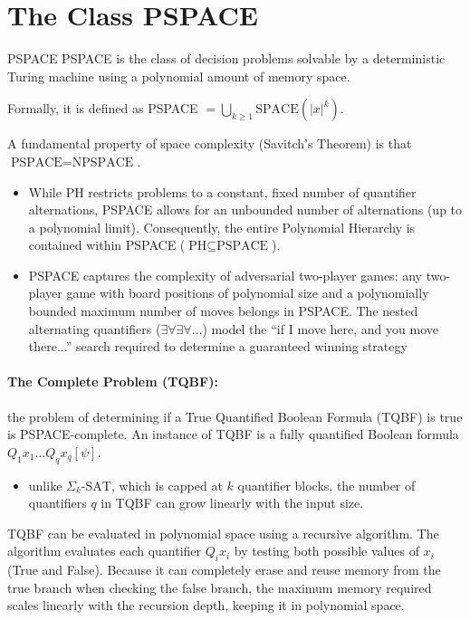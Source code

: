 \documentclass[a4paper, 11pt]{report}
\begin{document}
\section{The Class PSPACE}

\begin{defframe}{PSPACE}{}
PSPACE is the class of decision problems solvable by a deterministic Turing machine using a polynomial amount of memory space.

Formally, it is defined as PSPACE $= \bigcup_{k \ge 1} \text{SPACE}(|x|^k)$. 

A fundamental property of space complexity (Savitch's Theorem) is that $\text{PSPACE} = \text{NPSPACE}$.
\end{defframe}

\begin{itemize}
    \item While $\text{PH}$ restricts problems to a constant, fixed number of quantifier alternations, PSPACE allows for an unbounded number of alternations (up to a polynomial limit). Consequently, the entire Polynomial Hierarchy is contained within PSPACE ($\text{PH} \subseteq \text{PSPACE}$).

    \item PSPACE captures the complexity of adversarial two-player games: any two-player game with board positions of polynomial size and a polynomially bounded maximum number of moves belongs in PSPACE. The nested alternating quantifiers ($\exists \forall \exists \forall \dots$) model the ``if I move here, and you move there...'' search required to determine a guaranteed winning strategy
\end{itemize}

  \paragraph{The Complete Problem (TQBF):} the problem of determining if a True Quantified Boolean Formula (TQBF) is true is PSPACE-complete. An instance of TQBF is a fully quantified Boolean formula $Q_1 x_1 \dots Q_q x_q [\psi]$. 

\begin{itemize}
    \item unlike $\Sigma_k\text{-SAT}$, which is capped at $k$ quantifier blocks, the number of quantifiers $q$ in TQBF can grow linearly with the input size.
\end{itemize}

  TQBF can be evaluated in polynomial space using a recursive algorithm. The algorithm evaluates each quantifier $Q_i x_i$ by testing both possible values of $x_i$ (True and False). Because it can completely erase and reuse memory from the true branch when checking the false branch, the maximum memory required scales linearly with the recursion depth, keeping it in polynomial space.
\end{document}
